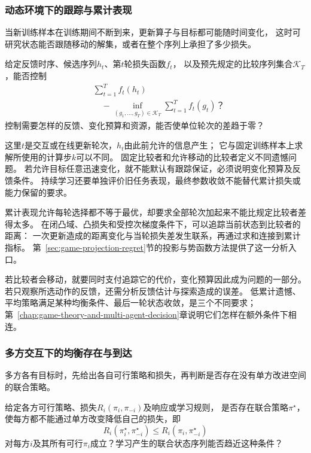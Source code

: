 \subsubsection{动态环境下的跟踪与累计表现}
\label{sec:future-analysis-cumulative-comparison}

当新训练样本在训练期间不断到来，更新算子与目标都可能随时间变化，
这时可研究状态能否跟随移动的解集，或者在整个序列上承担了多少损失。

\begin{mathproblem}[序列相对于比较者的累计表现]
  \label{question:future-cumulative-comparison}
  给定反馈时序、候选序列$h_t$、第$t$轮损失函数$f_t$，
  以及预先规定的比较序列集合$\mathcal K_T$，能否控制
  \[
    \begin{aligned}
      &\sum_{t=1}^Tf_t(h_t)\\
      &\quad-\inf_{(g_1,\ldots,g_T)\in\mathcal K_T}
         \sum_{t=1}^Tf_t(g_t)\text{？}
    \end{aligned}
  \]
  控制需要怎样的反馈、变化预算和资源，能否使单位轮次的差趋于零？
\end{mathproblem}

这里$t$是交互或在线更新轮次，$h_t$由此前允许的信息产生；
它与固定训练样本上求解所使用的计算步$k$可以不同。
固定比较者和允许移动的比较者定义不同遗憾问题。
若允许目标任意迅速变化，就不能默认有跟踪保证，必须说明变化预算及反馈条件。
持续学习还要单独评价旧任务表现，最终参数收敛不能替代累计损失或能力保留的要求。

累计表现允许每轮选择都不等于最优，却要求全部轮次加起来不能比规定比较者差得太多。
在闭凸域、凸损失和受控次梯度条件下，可以追踪当前状态到比较者的距离：
一次更新造成的距离变化与当轮损失差发生联系，再通过求和连接到累计指标。
第~\ref{sec:game-projection-regret}节的投影与势函数方法提供了这一分析入口。

若比较者会移动，就要同时支付追踪它的代价，变化预算因此成为问题的一部分。
若只观察所选动作的反馈，还需分析反馈估计与探索造成的误差。
低累计遗憾、平均策略满足某种均衡条件、最后一轮状态收敛，是三个不同要求；
第~\ref{chap:game-theory-and-multi-agent-decision}章说明它们怎样在额外条件下相连。

\subsubsection{多方交互下的均衡存在与到达}
\label{sec:future-analysis-equilibrium}

多方各有目标时，先给出各自可行策略和损失，再判断是否存在没有单方改进空间的联合策略。

\begin{mathproblem}[多方响应能否达到所求均衡]
  \label{question:future-equilibrium}
  给定各方可行策略、损失$R_i(\pi_i,\pi_{-i})$及响应或学习规则，
  是否存在联合策略$\pi^\star$，使每方都不能通过单方改变降低自己的损失，即
  \[
    R_i(\pi_i^\star,\pi_{-i}^\star)
    \leq R_i(\pi_i,\pi_{-i}^\star)
  \]
  对每方$i$及其所有可行$\pi_i$成立？学习产生的联合状态序列能否趋近这种条件？
\end{mathproblem}

